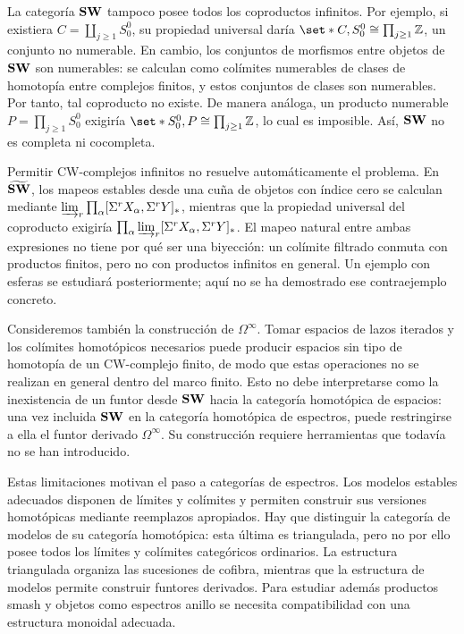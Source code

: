 La categoría $\mathbf{SW}$ tampoco posee todos los coproductos infinitos. Por ejemplo, si existiera $C=\coprod_{j\geq1}S^0_0$, su propiedad universal daría $\set*{C,S^0_0}\cong\prod_{j\geq1}\mathbb Z$, un conjunto no numerable. En cambio, los conjuntos de morfismos entre objetos de $\mathbf{SW}$ son numerables: se calculan como colímites numerables de clases de homotopía entre complejos finitos, y estos conjuntos de clases son numerables. Por tanto, tal coproducto no existe. De manera análoga, un producto numerable $P=\prod_{j\geq1}S^0_0$ exigiría $\set*{S^0_0,P}\cong\prod_{j\geq1}\mathbb Z$, lo cual es imposible. Así, $\mathbf{SW}$ no es completa ni cocompleta.

Permitir CW-complejos infinitos no resuelve automáticamente el problema. En $\widetilde{\mathbf{SW}}$, los mapeos estables desde una cuña de objetos con índice cero se calculan mediante $\varinjlim\nolimits_r\prod_\alpha[\Sigma^rX_\alpha,\Sigma^rY]_*$, mientras que la propiedad universal del coproducto exigiría $\prod_\alpha\varinjlim\nolimits_r[\Sigma^rX_\alpha,\Sigma^rY]_*$. El mapeo natural entre ambas expresiones no tiene por qué ser una biyección: un colímite filtrado conmuta con productos finitos, pero no con productos infinitos en general. Un ejemplo con esferas se estudiará posteriormente; aquí no se ha demostrado ese contraejemplo concreto.

Consideremos también la construcción de $\Omega^\infty$. Tomar espacios de lazos iterados y los colímites homotópicos necesarios puede producir espacios sin tipo de homotopía de un CW-complejo finito, de modo que estas operaciones no se realizan en general dentro del marco finito. Esto no debe interpretarse como la inexistencia de un funtor desde $\mathbf{SW}$ hacia la categoría homotópica de espacios: una vez incluida $\mathbf{SW}$ en la categoría homotópica de espectros, puede restringirse a ella el funtor derivado $\Omega^\infty$. Su construcción requiere herramientas que todavía no se han introducido.

Estas limitaciones motivan el paso a categorías de espectros. Los modelos estables adecuados disponen de límites y colímites y permiten construir sus versiones homotópicas mediante reemplazos apropiados. Hay que distinguir la categoría de modelos de su categoría homotópica: esta última es triangulada, pero no por ello posee todos los límites y colímites categóricos ordinarios. La estructura triangulada organiza las sucesiones de cofibra, mientras que la estructura de modelos permite construir funtores derivados. Para estudiar además productos smash y objetos como espectros anillo se necesita compatibilidad con una estructura monoidal adecuada.
